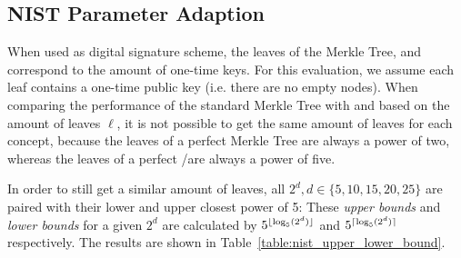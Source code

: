 \subsection{NIST Parameter Adaption}
\label{sec:nist_param_to_leaves}
When used as digital signature scheme, the leaves of the Merkle Tree, \tftree and \extree correspond to the amount of one-time keys. For this evaluation, we assume each leaf contains a one-time public key (i.e. there are no empty nodes). When comparing the performance of the standard Merkle Tree with \tftree and \extree based on the amount of leaves $\ell$, it is not possible to get the same amount of leaves for each concept, because the leaves of a perfect Merkle Tree are always a power of two, whereas the leaves of a perfect \tftree\xspace/\xspace\extree are always a power of five. 
 
In order to still get a similar amount of leaves, all $2^d, d \in \{5,10,15,20,25\}$ are paired with their lower and upper closest power of 5:
These \textit{upper bounds} and \textit{lower bounds} for a given $2^d$ are calculated by $5^{\lfloor\log_5(2^d)\rfloor}$ and $5^{\lceil\log_5(2^d)\rceil}$ respectively. The results are shown in Table~\ref{table:nist_upper_lower_bound}. 

